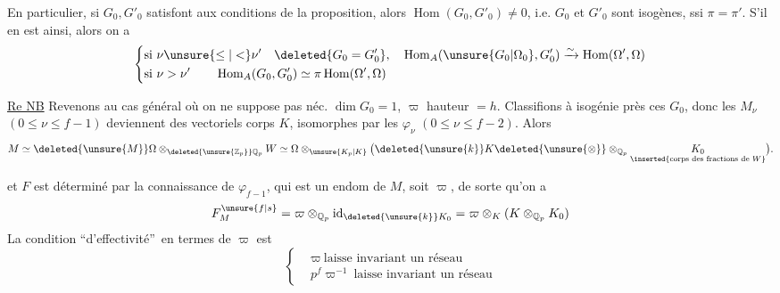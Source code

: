 En particulier, si $G_0,G'_0$ satisfont aux conditions de la proposition, alors $\operatorname{Hom}(G_0,G'_0)\ne 0$, i.e. $G_0$ et $G'_0$ sont isogènes, ssi $\pi=\pi'$.  S'il en est ainsi, alors  on a
\[
\left\{\begin{aligned}
&\text{si }\nu\unsure{\leq|<}\nu'\quad\deleted{G_0=G'_0},\quad \operatorname{Hom}_A(\unsure{G_0|\Omega_0},G'_0)\xrightarrow{\sim}\operatorname{Hom}(\Omega',\Omega)\\
&\text{si }\nu>\nu'\qquad\operatorname{Hom}_A(G_0,G'_0)\simeq\pi\operatorname{Hom}(\Omega',\Omega)
\end{aligned}\right.
\]

\uline{Re NB} Revenons au cas général où on ne suppose pas néc. $\dim G_0=1$,  $\varpi$ hauteur $=h$. Classifions à isogénie près  ces $G_0$, donc les $M_\nu$ $(0\leq\nu\leq f-1)$ deviennent des vectoriels   corps $K$, isomorphes par les $\varphi_\nu$ $(0\leq\nu\leq f-2)$. Alors 
\[
M\simeq\deleted{\unsure{M}}\Omega\otimes_{\deleted{\unsure{\mathbb Z_p}}\mathbb Q_p}W\simeq\Omega\otimes_{\unsure{K_p|K}}\bigl(\deleted{\unsure{k}}K\deleted{\unsure{\otimes}}\otimes_{\mathbb Q_p}\underset{\inserted{\text{corps des fractions de } W}}{K_0}\bigr).
\]

et $F$ est déterminé par la connaissance de $\varphi_{f-1}$, qui est un endom de $M$, soit $\varpi$, de sorte qu'on a
\[
F_M^{\unsure{f|s}}=\varpi\otimes_{\mathbb Q_p}\mathrm{id}_{\deleted{\unsure{k}}K_0}=\varpi\otimes_K(K\otimes_{\mathbb Q_p}K_0)
\]
La condition \textquotedblleft d'effectivité\textquotedblright\ en termes de $\varpi$ est
\[
\left\{\begin{aligned}
&\varpi\ \text{laisse invariant un réseau}\\
&p^f\varpi^{-1}\ \text{laisse invariant un réseau}
\end{aligned}\right.
\]
